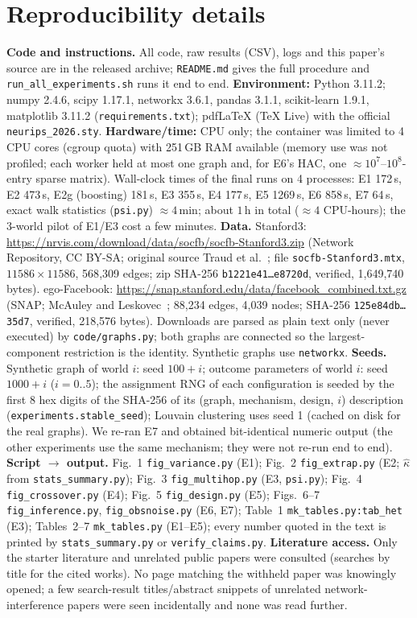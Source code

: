 \section{Reproducibility details}
\label{app:repro}
\textbf{Code and instructions.} All code, raw results (CSV), logs and this paper's source are in the released archive; \texttt{README.md} gives the full procedure and \texttt{run\_all\_experiments.sh} runs it end to end. \textbf{Environment:} Python 3.11.2; numpy 2.4.6, scipy 1.17.1, networkx 3.6.1, pandas 3.1.1, scikit-learn 1.9.1, matplotlib 3.11.2 (\texttt{requirements.txt}); pdfLaTeX (TeX Live) with the official \texttt{neurips\_2026.sty}. \textbf{Hardware/time:} CPU only; the container was limited to 4 CPU cores (cgroup quota) with 251\,GB RAM available (memory use was not profiled; each worker held at most one graph and, for E6's HAC, one $\approx10^7$--$10^8$-entry sparse matrix). Wall-clock times of the final runs on 4 processes: E1 172\,s, E2 473\,s, E2g (boosting) 181\,s, E3 355\,s, E4 177\,s, E5 1269\,s, E6 858\,s, E7 64\,s, exact walk statistics (\texttt{psi.py}) $\approx4$\,min; about $1$\,h in total ($\approx4$ CPU-hours); the 3-world pilot of E1/E3 cost a few minutes.
\textbf{Data.} Stanford3: \url{https://nrvis.com/download/data/socfb/socfb-Stanford3.zip} (Network Repository, CC BY-SA; original source Traud et al.~\citep{traud2012social}; file \texttt{socfb-Stanford3.mtx}, $11586\times11586$, 568{,}309 edges; zip SHA-256 \texttt{b1221e41\ldots e8720d}, verified, 1{,}649{,}740 bytes). ego-Facebook: \url{https://snap.stanford.edu/data/facebook_combined.txt.gz} (SNAP; McAuley and Leskovec~\citep{mcauley2012learning}; 88{,}234 edges, 4{,}039 nodes; SHA-256 \texttt{125e84db\ldots 35d7}, verified, 218{,}576 bytes). Downloads are parsed as plain text only (never executed) by \texttt{code/graphs.py}; both graphs are connected so the largest-component restriction is the identity. Synthetic graphs use \texttt{networkx}.
\textbf{Seeds.} Synthetic graph of world $i$: seed $100+i$; outcome parameters of world $i$: seed $1000+i$ ($i=0..5$); the assignment RNG of each configuration is seeded by the first 8 hex digits of the SHA-256 of its (graph, mechanism, design, $i$) description (\texttt{experiments.stable\_seed}); Louvain clustering uses seed 1 (cached on disk for the real graphs). We re-ran E7 and obtained bit-identical numeric output (the other experiments use the same mechanism; they were not re-run end to end).
\textbf{Script $\to$ output.} Fig.~1 \texttt{fig\_variance.py} (E1); Fig.~2 \texttt{fig\_extrap.py} (E2; $\hat\kappa$ from \texttt{stats\_summary.py}); Fig.~3 \texttt{fig\_multihop.py} (E3, \texttt{psi.py}); Fig.~4 \texttt{fig\_crossover.py} (E4); Fig.~5 \texttt{fig\_design.py} (E5); Figs.~6--7 \texttt{fig\_inference.py}, \texttt{fig\_obsnoise.py} (E6, E7); Table~1 \texttt{mk\_tables.py:tab\_het} (E3); Tables~2--7 \texttt{mk\_tables.py} (E1--E5); every number quoted in the text is printed by \texttt{stats\_summary.py} or \texttt{verify\_claims.py}. \textbf{Literature access.} Only the starter literature and unrelated public papers were consulted (searches by title for the cited works). No page matching the withheld paper was knowingly opened; a few search-result titles/abstract snippets of unrelated network-interference papers were seen incidentally and none was read further.
